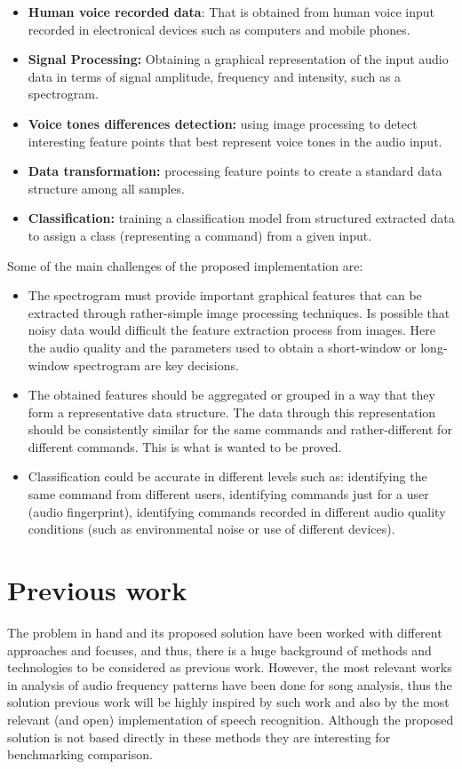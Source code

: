 \documentclass[anon]{CI}
\begin{document}
\begin{itemize}
\item \textbf{Human voice recorded data}: That is obtained from human voice input recorded in electronical devices such as computers and mobile phones. 
\item \textbf{Signal Processing: }Obtaining a graphical representation of the input audio data in terms of signal amplitude, frequency and intensity, such as a spectrogram.
\item \textbf{Voice tones differences detection: }using image processing to detect interesting feature points that best represent voice tones in the audio input.
\item \textbf{Data transformation: }processing feature points to create a standard data structure among all samples.
\item \textbf{Classification: }training a classification model from structured extracted data to assign a class (representing a command) from a given input.
\end{itemize}

Some of the main challenges of the proposed implementation are:
\begin{itemize}
	\item The spectrogram must provide important graphical features that can be extracted through rather-simple image processing techniques. Is possible that noisy data would difficult the feature extraction process from images. Here the audio quality and the parameters used to obtain a short-window or long-window spectrogram are key decisions.
	\item The obtained features should be aggregated or grouped in a way that they form a representative data structure. The data through this representation should be consistently similar for the same commands and rather-different for different commands. This is what is wanted to be proved.
	\item Classification could be accurate in different levels such as: identifying the same command from different users, identifying commands just for a user (audio fingerprint), identifying commands recorded in different audio quality conditions (such as environmental noise or use of different devices).
\end{itemize}

\section{Previous work}
The problem in hand and its proposed solution have been worked with different approaches and focuses, and thus, there is a huge background of methods and technologies to be considered as previous work. However, the most relevant works in analysis of audio frequency patterns have been done for song analysis, thus the solution previous work will be highly inspired by such work and also by the most relevant (and open)  implementation of speech recognition. Although the proposed solution is not based directly in these methods they are interesting for benchmarking comparison.
\end{document}
